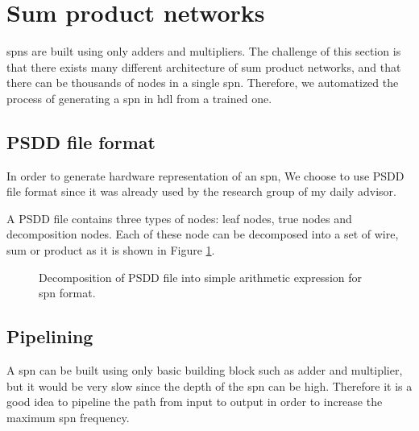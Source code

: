 \section{Sum product networks}

\Glspl{spn} are built using only adders and multipliers. The challenge of this section is that there exists many different architecture of sum product networks, and that there can be thousands of nodes in a single \gls{spn}. Therefore, we automatized the process of generating a \gls{spn} in \gls{hdl} from a trained one.

\subsection{PSDD file format}
In order to generate hardware representation of an \gls{spn}, We choose to use PSDD file format since it was already used by the research group of my daily advisor.

A PSDD file contains three types of nodes: leaf nodes, true nodes and decomposition nodes. Each of these node can be decomposed into a set of wire, sum or product as it is shown in Figure \ref{fig:psdd2spn}.

\begin{figure}[!ht]
\begin{mdframed}
  \centering
   \hspace{0.5cm}
   \hspace{0.5cm}
  \caption{Decomposition of PSDD file into simple arithmetic expression for \gls{spn} format.}
  \label{fig:psdd2spn}
\end{mdframed}
\end{figure}


\subsection{Pipelining}
A \gls{spn} can be built using only basic building block such as adder and multiplier, but it would be very slow since the depth of the \gls{spn} can be high. Therefore it is a good idea to pipeline the path from input to output in order to increase the maximum \gls{spn} frequency.

